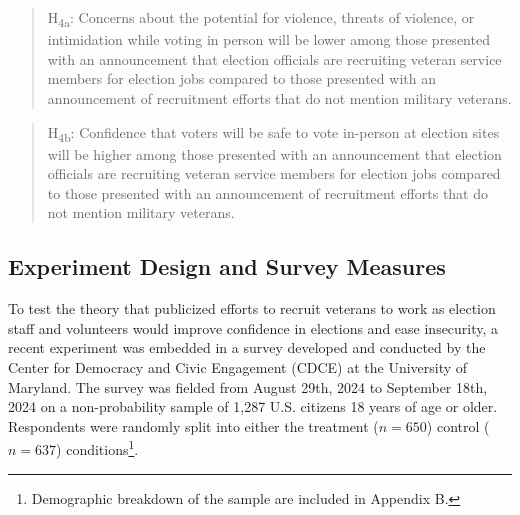 \documentclass[
  12pt,
  letterpaper,
]{article}
\begin{document}
\begin{quote}
H\textsubscript{4a}: Concerns about the potential for violence, threats
of violence, or intimidation while voting in person will be lower among
those presented with an announcement that election officials are
recruiting veteran service members for election jobs compared to those
presented with an announcement of recruitment efforts that do not
mention military veterans.
\end{quote}

\begin{quote}
H\textsubscript{4b}: Confidence that voters will be safe to vote
in-person at election sites will be higher among those presented with an
announcement that election officials are recruiting veteran service
members for election jobs compared to those presented with an
announcement of recruitment efforts that do not mention military
veterans.
\end{quote}

\subsection{Experiment Design and Survey
Measures}\label{experiment-design-and-survey-measures}

To test the theory that publicized efforts to recruit veterans to work
as election staff and volunteers would improve confidence in elections
and ease insecurity, a recent experiment was embedded in a survey
developed and conducted by the Center for Democracy and Civic Engagement
(CDCE) at the University of Maryland. The survey was fielded from August
29th, 2024 to September 18th, 2024 on a non-probability sample of 1,287
U.S. citizens 18 years of age or older. Respondents were randomly split
into either the treatment (\(n = 650\)) control (\(n = 637\))
conditions\footnote{Demographic breakdown of the sample are included in
  Appendix B.}.
\end{document}

